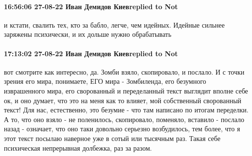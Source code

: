 \paragraph{16:56:06 27-08-22 Иван Демидов Киевreplied to Not}

и кстати, свалить тех, кто за бабло, легче, чем идейных. Идейные сильнее
заряжены психически, и их дольше нужно обрабатывать


\paragraph{17:13:02 27-08-22 Иван Демидов Киевreplied to Not}

вот смотрите как интересно, да. Зомби взяло, скопировало, и послало. И с точки
зрения его мира, понимаете, ЕГО мира - Зомбиленда, его безумного изврашенного
мира, его сворованный и переделанный текст выглядит вполне себе ок, и оно
думает, что это на меня как то влияет, мой собственный сворованный текст! Для
нас, естественно, это безумие - что там написано по итогам переделки. А то, что
оно взяло - не поленилось, скопировало, поменяло, вставило - послало назад -
означает, что оно таки довольно серьезно возбудилось, тем более, что я этот
текст посылаю наверное уже в сотый или тысячным раз. Такая себе психическая
непрерывная долбежка, раз за разом.

